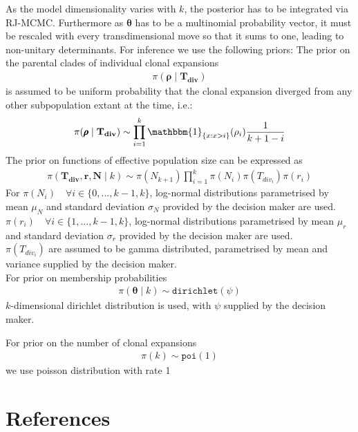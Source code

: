 \documentclass{report}
\theoremstyle{definition}
\begin{document}
As the model dimensionality varies with $k$, the posterior has to be integrated via RJ-MCMC. Furthermore as $\pmb{\theta}$ has to be a multinomial probability vector, it must be rescaled with every transdimensional move so that it sums to one, leading to non-unitary determinants. For inference we use the following priors:
The prior on the parental clades of individual clonal expansions
\begin{gather}
\pi(\pmb{\rho}\mid \mathbf{T_{div}}) 
\end{gather}
is assumed to be uniform probability that the clonal expansion diverged from any other subpopulation extant at the time, i.e.:
\begin{gather}
\pi(\pmb{\rho}\mid \mathbf{T_{div}}) \sim \prod\limits_{i=1}^{k} \mathbbm{1}_{\{x:x>i\}}(\rho_i)\frac{1}{k+1-i}  
\end{gather}
The prior on functions of effective population size can be expressed as
\begin{gather}
\pi(\mathbf{T_{div}}, \mathbf{r}, \mathbf{N}\mid k) \sim \pi(N_{k+1})\prod\limits_{i=1}^{k}\pi(N_i)\pi(T_{div_i})\pi(r_i)
\end{gather}
For $\pi(N_i)\quad \forall i\in\{0,...,k-1,k\}$, log-normal distributions parametrised by mean $\mu_N$ and standard deviation $\sigma_N$ provided by the decision maker are used.\\
$\pi(r_i)\quad \forall i\in\{1,...,k-1,k\}$, log-normal distributions parametrised by mean $\mu_r$ and standard deviation $\sigma_r$ provided by the decision maker are used.\\
$\pi(T_{div_i})$ are assumed to be gamma distributed, parametrised by mean and variance supplied by the decision maker.\\
For prior on membership probabilities
\begin{gather}
\pi(\pmb{\theta}\mid k) \sim \texttt{dirichlet}(\psi)
\end{gather}
$k$-dimensional dirichlet distribution is used, with $\psi$ supplied by the decision maker.

For prior on the number of clonal expansions
\begin{gather}
\pi(k) \sim \texttt{poi}(1)
\end{gather}
we use poisson distribution with rate 1
\chapter{References}
\printbibliography
\end{document}
